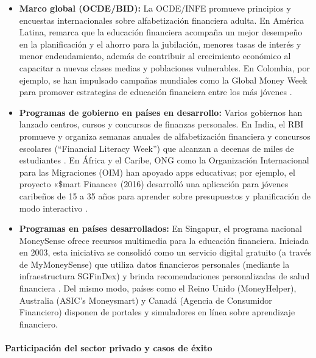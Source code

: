 \begin{itemize}
	\item \textbf{Marco global (OCDE/BID):} La OCDE/INFE promueve principios y encuestas internacionales sobre alfabetización financiera adulta. En América Latina, \textcite[p. 4]{FinLit01} remarca que la educación financiera acompaña un mejor desempeño en la planificación y el ahorro para la jubilación, menores tasas de interés y menor endeudamiento, además de contribuir al crecimiento económico al capacitar a nuevas clases medias y poblaciones vulnerables. En Colombia, por ejemplo, se han impulsado campañas mundiales como la Global Money Week para promover estrategias de educación financiera entre los más jóvenes \parencite{BancadeOportunidades03}.
	
	\item \textbf{Programas de gobierno en países en desarrollo:} Varios gobiernos han lanzado centros, cursos y concursos de finanzas personales. En India, el RBI promueve y organiza semanas anuales de alfabetización financiera y concursos escolares (``Financial Literacy Week'') que alcanzan a decenas de miles de estudiantes \parencite{BancodeIndia01}. En África y el Caribe, ONG como la Organización Internacional para las Migraciones (OIM) han apoyado apps educativas; por ejemplo, el proyecto «\$mart Finance» (2016) desarrolló una aplicación para jóvenes caribeños de 15 a 35 años para aprender sobre presupuestos y planificación de modo interactivo \parencite{IOM01}.
	
	\item \textbf{Programas en países desarrollados:} En Singapur, el programa nacional MoneySense ofrece recursos multimedia para la educación financiera. Iniciada en 2003, esta iniciativa se consolidó como un servicio digital gratuito (a través de MyMoneySense) que utiliza datos financieros personales (mediante la infraestructura SGFinDex) y brinda recomendaciones personalizadas de salud financiera \parencite{MoneySense01}. Del mismo modo, países como el Reino Unido (MoneyHelper), Australia (ASIC’s Moneysmart) y Canadá (Agencia de Consumidor Financiero) disponen de portales y simuladores en línea sobre aprendizaje financiero.
\end{itemize}

\paragraph*{Participación del sector privado y casos de éxito}

